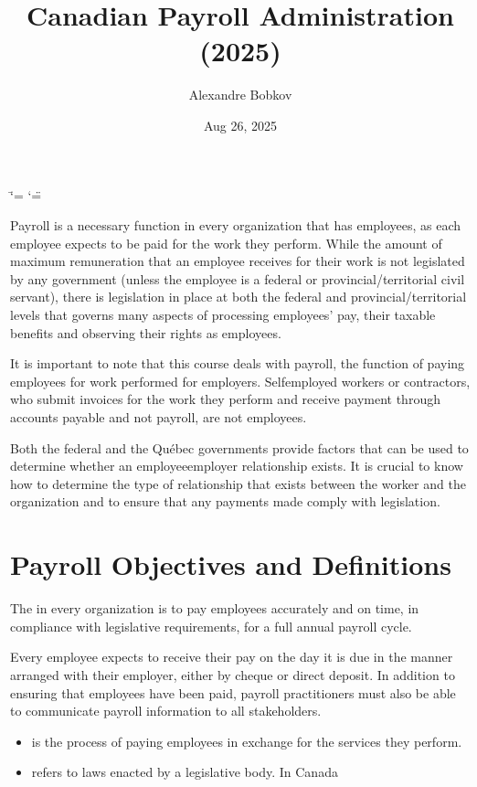 \documentclass[letterpaper,10pt,english]{sphinxmanual}
\title{Canadian Payroll Administration (2025)}
\date{Aug 26, 2025}
\author{Alexandre Bobkov}
\begin{document}
\ifdefined\shorthandoff
  \ifnum\catcode`\=\string=\active\shorthandoff{=}\fi
  \ifnum\catcode`\"=\active{}\fi
\fi

\pagestyle{empty}
\sphinxmaketitle
\pagestyle{plain}
\sphinxtableofcontents
\pagestyle{normal}
\label{\detokenize{index::doc}}
\sphinxstepscope



\sphinxAtStartPar
Payroll is a necessary function in every organization that has employees,
as each employee expects to be paid for the work they perform. While the
amount of maximum remuneration that an employee receives for their work is
not legislated by any government (unless the employee is a federal or
provincial/territorial civil servant), there is legislation in place at
both the federal and provincial/territorial levels that governs many
aspects of processing employees’ pay, their taxable benefits and observing
their rights as employees.

\sphinxAtStartPar
It is important to note that this course deals with payroll, the function of paying employees
for work performed for employers. Self\sphinxhyphen{}employed workers or contractors, who submit
invoices for the work they perform and receive payment through accounts payable and not
payroll, are not employees.

\sphinxAtStartPar
Both the federal and the Québec governments provide factors that can be used to determine
whether an employee\sphinxhyphen{}employer relationship exists. It is crucial to know how to determine the
type of relationship that exists between the worker and the organization and to ensure that
any payments made comply with legislation.


\chapter{Payroll Objectives and Definitions}
\label{\detokenize{1_introduction:payroll-objectives-and-definitions}}
\sphinxAtStartPar
The  in every organization is to
pay employees accurately and on time, in compliance with legislative
requirements, for a full annual payroll cycle.

\sphinxAtStartPar
Every employee expects to receive their pay on the day it is due in the
manner arranged with their employer, either by cheque or direct deposit.
In addition to ensuring that employees have been paid, payroll
practitioners must also be able to communicate payroll information to
all stakeholders.
\begin{itemize}
\item {} 
\sphinxAtStartPar
{} is the process of paying employees in exchange for the services they perform.

\item {} 
\sphinxAtStartPar
{} refers to laws enacted by a legislative body. In Canada

\end{itemize}
\end{document}
